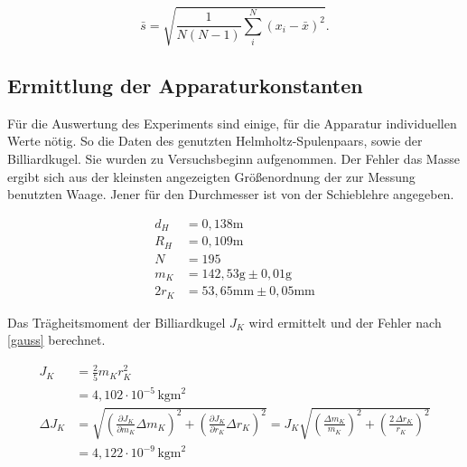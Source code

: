 \begin{equation}
 \bar s = \sqrt{\frac{1}{N(N-1)} \sum_{i}^{N} (x_i - \bar{x})^2}.
\end{equation}

\subsection{Ermittlung der Apparaturkonstanten}
Für die Auswertung des Experiments sind einige, für die Apparatur individuellen Werte nötig. So die Daten des genutzten Helmholtz-Spulenpaars,
sowie der Billiardkugel. Sie wurden zu Versuchsbeginn aufgenommen. Der Fehler das Masse ergibt sich aus der kleinsten angezeigten Größenordnung
der zur Messung benutzten Waage. Jener für den Durchmesser ist von der Schieblehre angegeben.

\begin{align*}
 d_H &= 0,138 \text{m} \\
 R_H &= 0,109 \text{m}\\
 N &= 195\\
 m_K &= 142,53 \text{g} \pm 0,01 \text{g}\\
 2r_K &= 53,65 \text{mm} \pm 0,05 \text{mm}
\end{align*}

Das Trägheitsmoment der Billiardkugel $J_K$ wird ermittelt und der Fehler nach \eqref{gauss} berechnet.

\begin{align}
\nonumber
 J_K &= \frac25 m_K r_K^2 \\
 &= 4,102 \cdot 10^{-5} \, \text{kgm}^2\\
 \nonumber
 \Delta J_K &= \sqrt{\left(\frac{\partial J_K}{\partial m_K} \Delta m_K \right)^2 + \left(\frac{\partial J_K}{\partial r_K} \Delta r_K \right)^2 } = J_K \sqrt{\left( \frac{\Delta m_K}{m_K} \right)^2 + \left( \frac{2 \, \Delta r_K}{r_K} \right)^2}\\
 &= 4,122 \cdot 10^{-9} \, \text{kgm}^2
\end{align}

